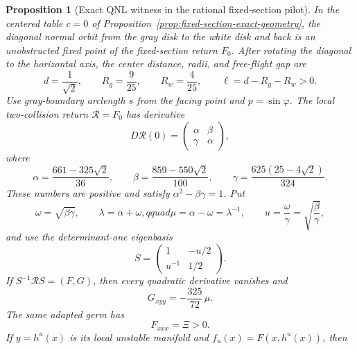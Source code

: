 \documentclass[11pt]{article}
\newtheorem{proposition}[theorem]{Proposition}
\begin{document}
\begin{proposition}[Exact QNL witness in the rational fixed-section pilot]
\label{prop:fixed-section-exact-qnl-witness}
In the centered table $c=0$ of
Proposition~\ref{prop:fixed-section-exact-geometry}, the diagonal normal
orbit from the gray disk to the white disk and back is an unobstructed fixed
point of the fixed-section return $F_0$.  After rotating the diagonal to the
horizontal axis, the center distance, radii, and free-flight gap are
\[
 d=\frac1{\sqrt2},\qquad
 R_g=\frac9{25},\qquad R_w=\frac4{25},\qquad
 \ell=d-R_g-R_w>0.
\]
Use gray-boundary arclength $s$ from the facing point and
$p=\sin\varphi$.  The local two-collision return
$\mathcal R=F_0$ has derivative
\begin{equation}
\label{eq:fixed-section-pilot-linear-return}
 D\mathcal R(0)=
 \begin{pmatrix}\alpha&\beta\\ \gamma&\alpha\end{pmatrix},
\end{equation}
where
\begin{equation}
\label{eq:fixed-section-pilot-linear-coefficients}
 \alpha=\frac{661-325\sqrt2}{36},\qquad
 \beta=\frac{859-550\sqrt2}{100},\qquad
 \gamma=\frac{625(25-4\sqrt2)}{324}.
\end{equation}
These numbers are positive and satisfy
$\alpha^2-\beta\gamma=1$.  Put
\[
 \omega=\sqrt{\beta\gamma},\qquad
 \lambda=\alpha+\omega,qquad
 \mu=\alpha-\omega=\lambda^{-1},\qquad
 u=\frac{\omega}{\gamma}=\sqrt{\frac\beta\gamma},
\]
and use the determinant-one eigenbasis
\begin{equation}
\label{eq:fixed-section-pilot-eigenbasis}
 S=\begin{pmatrix}1&-u/2\\ u^{-1}&1/2\end{pmatrix}.
\end{equation}
If $S^{-1}\mathcal RS=(F,G)$, then every quadratic derivative vanishes and
\begin{equation}
\label{eq:fixed-section-pilot-cubic-witness}
 G_{xyy}=-\frac{325}{72}\,\mu.
\end{equation}
The same adapted germ has
\begin{equation}
\label{eq:fixed-section-pilot-unstable-cubic}
 F_{xxx}=\Xi>0.
\end{equation}
If $y=h^u(x)$ is its local unstable manifold and
$f_u(x)=F(x,h^u(x))$, then
\begin{equation}
\label{eq:fixed-section-pilot-log-distortion-seed}

\end{equation}
\end{proposition}
\end{document}
